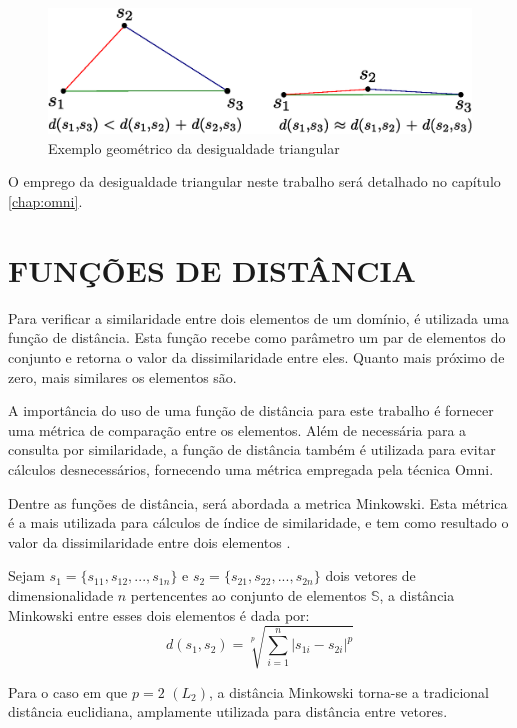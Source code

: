 \begin{figure}[H]
\centering
\includegraphics[width=.8\textwidth]{dados/figuras/desig_tri.eps} %
\caption{Exemplo geométrico da desigualdade triangular}
\label{fig:destri}
\end{figure}

O emprego da desigualdade triangular neste trabalho será detalhado no capítulo \ref{chap:omni}.

\section{FUNÇÕES DE DISTÂNCIA}
\label{sec:funcdist}
Para verificar a similaridade entre dois elementos de um domínio, é utilizada uma função de distância. Esta função recebe como parâmetro um par
de elementos do conjunto e retorna o valor da dissimilaridade entre eles. Quanto mais próximo de zero, mais similares os elementos são.\par

A importância do uso de uma função de distância para este trabalho é fornecer uma métrica de comparação entre os elementos. Além de
necessária para a consulta por similaridade, a função de distância também é utilizada para evitar cálculos desnecessários, fornecendo uma métrica
empregada pela técnica Omni.\par

Dentre as funções de distância, será abordada a metrica Minkowski. Esta métrica é a mais utilizada para cálculos de índice de similaridade, e tem como resultado o valor da 
dissimilaridade entre dois elementos \cite{Jain1988}.
\begin{mydef}
\label{def:mink}
  Sejam $s_1 = \{s_{11},s_{12},...,s_{1n}\}$ e $s_2 = \{s_{21},s_{22},...,s_{2n}\}$ dois vetores de dimensionalidade $n$ pertencentes ao conjunto de
  elementos $\mathbb{S}$, a distância Minkowski entre esses dois elementos é dada por:
\begin{equation}
		d(s_1,s_2) = \sqrt[p]{\sum_{i=1}^{n}|s_{1i} - s_{2i}|^p}
\end{equation}
\end{mydef}
Para o caso em que $p = 2$ $(L_2)$, a distância Minkowski torna-se a tradicional distância euclidiana, amplamente utilizada para distância entre vetores.

